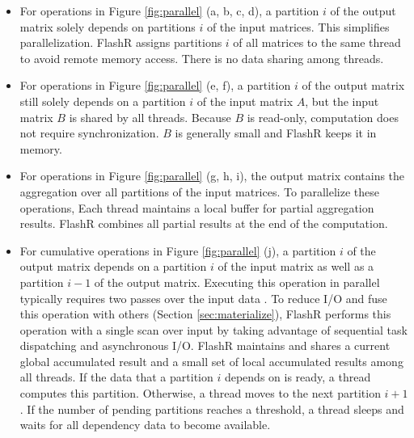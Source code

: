 \begin{itemize}
	\item For operations in Figure \ref{fig:parallel}
		(a, b, c, d), a partition $i$ of the output matrix solely depends
		on partitions $i$ of the input matrices. This simplifies
		parallelization. FlashR assigns partitions $i$ of all matrices to
		the same thread to avoid remote memory access. There is no data sharing
		among threads.
	\item For operations in Figure \ref{fig:parallel} (e, f), a partition
		$i$ of the output matrix still solely depends on a partition
		$i$ of the input matrix $A$, but the input matrix
		$B$ is shared by all threads. Because $B$ is
		read-only, computation does not require synchronization.
		$B$ is generally small and FlashR keeps it in memory.
	\item For operations in Figure
		\ref{fig:parallel} (g, h, i), the output matrix contains the aggregation
		over all partitions of the input matrices. To parallelize these operations,
		Each thread maintains a local buffer for partial aggregation results.
		FlashR combines all partial results at the end of
		the computation.
          \item For cumulative operations in Figure \ref{fig:parallel} (j),
		a partition $i$ of the output matrix depends on a partition $i$ of
		the input matrix as well as a partition $i-1$ of the output matrix.
		Executing this operation in parallel typically requires two passes over
		the input data \cite{Ladner1980}. To reduce I/O and fuse this operation
                with others (Section \ref{sec:materialize}), FlashR performs
		this operation with a single scan over input by taking advantage
                of sequential task dispatching and asynchronous I/O. FlashR maintains
		and shares a current global accumulated result and a small set of local
                accumulated results among all threads. If the data that a partition $i$
                depends on is ready, a thread computes this partition. Otherwise,
                a thread moves to the next partition $i+1$. If the number
		of pending partitions reaches a threshold, a thread sleeps
		and waits for all dependency data to become available.
\end{itemize}

